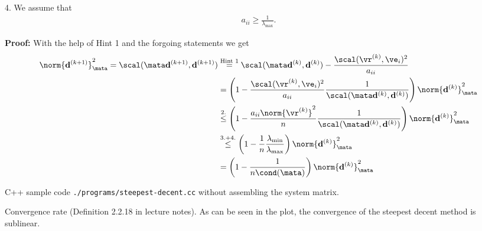 \begin{SolutionSheet}[\ref{sheet8}]
\begin{Solution}
    \begin{todo}
      4. We assume that
      \begin{align*}
        a_{ii} \geq \frac1{\lambda_{\max}}.
      \end{align*}
    \end{todo}

    \textbf{Proof:} With the help of Hint 1 and the forgoing
    statements we get
    \begin{align*}
      \norm{\vd^{(k+1)}}_{\mata}^2
      = \scal(\mata\vd^{(k+1)},\vd^{(k+1)})
      &\stackrel{\text{Hint 1}}{=}
        \scal(\mata\vd^{(k)},\vd^{(k)})
        - \frac{\scal(\vr^{(k)},\ve_i)^2}{a_{ii}}
      \\
      &=
        \left( 1 - \frac{\scal(\vr^{(k)},\ve_i)^2}{a_{ii}}
              \frac1{\scal(\mata\vd^{(k)},\vd^{(k)})} \right)
        \norm{\vd^{(k)}}_{\mata}^2
      \\
      &\stackrel{2.}{\leq}
        \left( 1 - \frac{a_{ii}\norm{\vr^{(k)}}^2}{n}
              \frac{1}{\scal(\mata\vd^{(k)},\vd^{(k)})} \right)
        \norm{\vd^{(k)}}_{\mata}^2
      \\
      &\stackrel{3.+4.}{\leq}
        \left( 1 - \frac{1}{n}
              \frac{\lambda_{\min}}{\lambda_{\max}} \right)
        \norm{\vd^{(k)}}_{\mata}^2
      \\
      &=
        \left( 1 - \frac{1}{n\cond(\mata)} \right)
        \norm{\vd^{(k)}}_{\mata}^2
    \end{align*}
    
  \end{Solution}

  \begin{Solution}
  \end{Solution}

  \begin{Solution}[Programming]
    C++ sample code \lstinline{./programs/steepest-decent.cc} without
    assembling the system matrix.

    Convergence rate (Definition 2.2.18 in lecture notes).  As can be
    seen in the plot, the convergence of the steepest decent method is
    sublinear.
    

\end{Solution}
\end{SolutionSheet}
